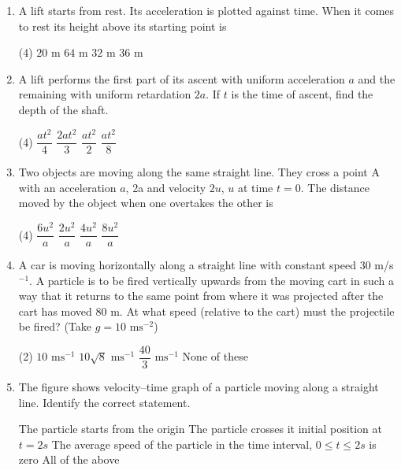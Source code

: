 \documentclass{article}
\renewcommand{\frac}[2]{\dfrac{#1}{#2}}
\begin{document}
\begin{enumerate}
    \item A lift starts from rest. Its acceleration is plotted against time. When it comes to rest its height above its starting point is 
    \begin{tasks}(4)
        \task \(20 \text{ m}\)
        \task \(64 \text{ m}\)
        \task \(32 \text{ m}\)
        \task \(36 \text{ m}\)
    \end{tasks}
  
    \item A lift performs the first part of its ascent with uniform acceleration \(a\) and the remaining with uniform retardation \(2a\). If \(t\) is the time of ascent, find the depth of the shaft.
    \begin{tasks}(4)
        \task \(\frac{at^2}{4}\)
        \task \(\frac{2at^2}{3}\)
        \task \(\frac{at^2}{2}\)
        \task \(\frac{at^2}{8}\)
    \end{tasks}
  
    \item Two objects are moving along the same straight line. They cross a point A with an acceleration \(a\), 2a and velocity \(2u\), \(u\) at time \(t = 0\). The distance moved by the object when one overtakes the other is
    \begin{tasks}(4)
        \task \(\frac{6u^2}{a}\)
        \task \(\frac{2u^2}{a}\)
        \task \(\frac{4u^2}{a}\)
        \task \(\frac{8u^2}{a}\)
    \end{tasks}
  
    \item A car is moving horizontally along a straight line with constant speed 30 m/s\(^{-1}\). A particle is to be fired vertically upwards from the moving cart in such a way that it returns to the same point from where it was projected after the cart has moved 80 m. At what speed (relative to the cart) must the projectile be fired? (Take \(g = 10 \text{ ms}^{-2}\))
    \begin{tasks}(2)
        \task \(10 \text{ ms}^{-1}\)
        \task \(10\sqrt{8} \text{ ms}^{-1}\)
        \task \(\frac{40}{3} \text{ ms}^{-1}\)
        \task None of these
    \end{tasks}
  
    \item The figure shows velocity--time graph of a particle moving along a straight line. Identify the correct statement.
    \begin{tasks}
        \task The particle starts from the origin
        \task The particle crosses it initial position at \(t = 2s\)
        \task The average speed of the particle in the time interval, \(0 \leq t \leq 2s\) is zero
        \task All of the above
    \end{tasks}


\end{enumerate}
\end{document}
